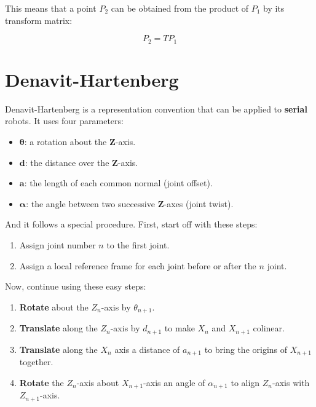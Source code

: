 \documentclass[titlepage, letterpaper, fleqn]{article}
\let\bs\mathbf
\begin{document}
This means that a point $P_2$ can be obtained from the product of $P_1$ by its transform matrix:

\begin{equation}
    \label{eq:transforming}
    P_2 = T P_1
\end{equation}



\section{Denavit-Hartenberg} %
\label{sec:denavit}

Denavit-Hartenberg is a representation convention that can be applied to \textbf{serial} robots.
It uses four parameters:

\begin{itemize}
    \item $\bs{\theta}$: a rotation about the $\bs{Z}$-axis.
    \item $\textbf{d}$: the distance over the $\bs{Z}$-axis.
    \item $\textbf{a}$: the length of each common normal (joint offset).
    \item $\bs{\alpha}$: the angle between two successive $\bs{Z}$-axes (joint twist).
\end{itemize}

And it follows a special procedure.
First, start off with these steps:

\begin{enumerate}
    \item Assign joint number $n$ to the first joint.
    \item Assign a local reference frame for each joint before or after the $n$ joint.
\end{enumerate}

Now, continue using these easy steps:

\begin{enumerate}
    \item \textbf{Rotate} about the $Z_n$-axis by $\theta_{n+1}$.
    \item \textbf{Translate} along the $Z_n$-axis by $d_{n+1}$ to make $X_n$ and $X_{n+1}$ colinear.
    \item \textbf{Translate} along the $X_n$ axis a distance of $a_{n+1}$ to bring the origins of $X_{n+1}$ together.
    \item \textbf{Rotate} the $Z_n$-axis about $X_{n+1}$-axis an angle of $\alpha_{n+1}$ to align $Z_n$-axis with $Z_{n+1}$-axis.
\end{enumerate}
\end{document}
